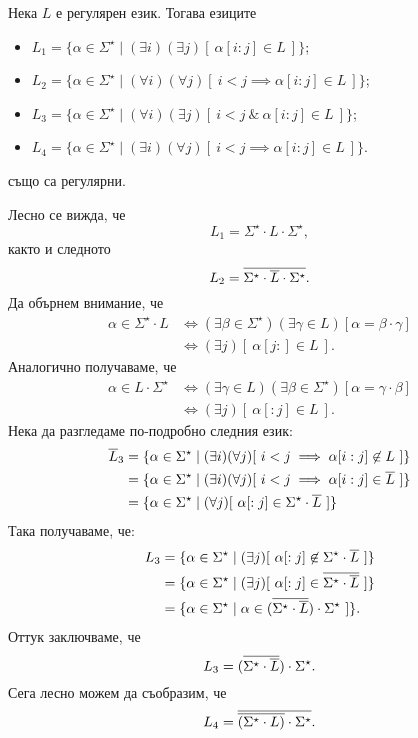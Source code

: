 \begin{extra}
\begin{problem}
  Нека $L$ е регулярен език. Тогава езиците
  \begin{itemize}
  \item
    $L_1 = \{ \alpha \in \Sigma^\star \mid (\exists i)(\exists j)[\ \alpha[i:j] \in L\ ]\}$;
  \item
    $L_2 = \{ \alpha \in \Sigma^\star \mid (\forall i)(\forall j)[\ i < j \implies \alpha[i:j] \in L\ ]\}$;
  \item 
    $L_3 = \{ \alpha \in \Sigma^\star \mid (\forall i)(\exists j)[\ i < j\ \&\ \alpha[i:j] \in L\ ]\}$;
  \item
    $L_4 = \{ \alpha \in \Sigma^\star \mid (\exists i)(\forall j)[\ i < j \implies \alpha[i:j] \in L\ ]\}$.
  \end{itemize}
  също са регулярни.
\end{problem}
\begin{hint}
  Лесно се вижда, че
  \[L_1 = \Sigma^\star \cdot L \cdot \Sigma^\star,\]
  както и следното
  \[L_2 = \overline{\Sigma^\star \cdot \overline{L} \cdot \Sigma^\star}.\]
  Да обърнем внимание, че
  \begin{align*}
    \alpha \in \Sigma^\star \cdot L & \iff (\exists \beta \in \Sigma^\star)(\exists \gamma \in L)[ \alpha = \beta \cdot \gamma]\\
                                    & \iff (\exists j)[\ \alpha[j:] \in L\ ].
  \end{align*}
  Аналогично получаваме, че
    \begin{align*}
      \alpha \in L\cdot \Sigma^\star & \iff (\exists \gamma \in L)(\exists \beta \in \Sigma^\star)[ \alpha = \gamma \cdot \beta ]\\
                                     & \iff (\exists j)[\ \alpha[:j] \in L\ ].
  \end{align*}
  Нека да разгледаме по-подробно следния език:
  \begin{align*}
    \ov{L}_3 & = \{\alpha \in \Sigma^\star \mid (\exists i)(\forall j)[\ i < j \implies \alpha[i:j] \not\in L\ ]\}\\
             & = \{\alpha \in \Sigma^\star \mid (\exists i)(\forall j)[\ i < j \implies \alpha[i:j] \in \ov{L}\ ]\}\\
             & = \{\alpha \in \Sigma^\star \mid (\forall j)[\ \alpha[:j] \in \Sigma^\star \cdot \ov{L}\ ]\}
  \end{align*}
  Така получаваме, че:
  \begin{align*}
    L_3 & = \{\alpha \in \Sigma^\star \mid (\exists j)[\ \alpha[:j] \not\in \Sigma^\star \cdot \overline{L}\ ]\}\\
        & = \{\alpha \in \Sigma^\star \mid (\exists j)[\ \alpha[:j] \in \overline{\Sigma^\star \cdot \overline{L}}\ ]\}\\
        & = \{\alpha \in \Sigma^\star \mid \alpha \in (\overline{\Sigma^\star \cdot \overline{L}}) \cdot \Sigma^\star \ ]\}.
  \end{align*}
  Оттук заключваме, че
  \[L_3 = (\overline{\Sigma^\star \cdot \overline{L}}) \cdot \Sigma^\star.\]
  Сега лесно можем да съобразим, че
  \[ L_4 = \overline{ \overline{(\Sigma^\star \cdot L)} \cdot \Sigma^\star}.\]
\end{hint}


\end{extra}
